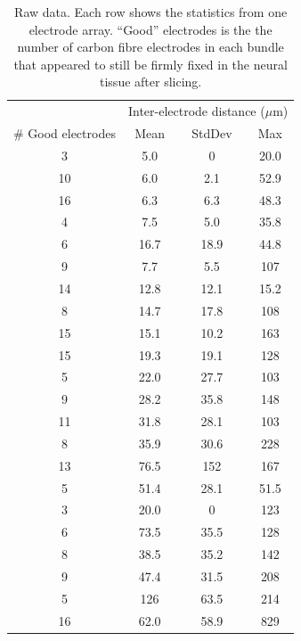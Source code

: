 \documentclass[10pt,letterpaper]{article}
\begin{document}
\begin{table}
  \begin{tabular}{cccc}
    & \multicolumn{3}{c}{Inter-electrode distance ($\mu$m)} \\
    \# Good electrodes & Mean & StdDev & Max \\
    \hline
     3  &  5.0    &    0 &  20.0 \\
   10  &  6.0   & 2.1 &  52.9 \\
   16  &  6.3   & 6.3 &  48.3 \\
    4  &  7.5   & 5.0 &  35.8 \\
    6  & 16.7  & 18.9 &  44.8 \\
    9  &  7.7   & 5.5 & 107 \\
   14 &  12.8  & 12.1 & 15.2 \\
    8 &  14.7  & 17.8 & 108 \\
   15&   15.1  & 10.2 & 163 \\
   15  & 19.3  & 19.1 & 128 \\
    5  & 22.0  & 27.7 & 103 \\
    9  & 28.2   & 35.8 & 148 \\
   11 &  31.8  & 28.1 & 103 \\
    8  & 35.9  & 30.6 & 228 \\
   13 &  76.5 & 152 & 167 \\
    5  & 51.4  & 28.1 &  51.5 \\
    3  & 20.0    &     0 & 123 \\
    6  & 73.5  & 35.5 & 128 \\
    8  & 38.5  & 35.2 & 142 \\
    9  & 47.4  & 31.5 & 208 \\
    5 & 126  & 63.5&  214 \\
    16 &  62.0 &  58.9&  829
  \end{tabular}
  \caption{Raw data.  Each row shows the statistics from one electrode array.  ``Good'' electrodes is the the number of carbon fibre electrodes in each bundle that appeared to still be firmly fixed in the neural tissue after slicing.}
  \label{table:splaydata}
\end{table}
\end{document}

